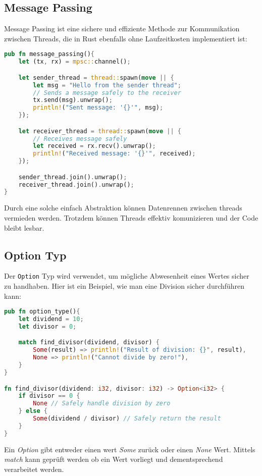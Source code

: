 \subsection{Message Passing}

Message Passing ist eine sichere und effiziente Methode zur Kommunikation zwischen Threads, die in Rust ebenfalls ohne Laufzeitkosten implementiert ist:

\begin{lstlisting}[language=Rust, caption=Message Passing ]
pub fn message_passing(){
    let (tx, rx) = mpsc::channel();

    let sender_thread = thread::spawn(move || {
        let msg = "Hello from the sender thread";
        // Sends a message safely to the receiver
        tx.send(msg).unwrap(); 
        println!("Sent message: '{}'", msg);
    });

    let receiver_thread = thread::spawn(move || {
        // Receives message safely
        let received = rx.recv().unwrap(); 
        println!("Received message: '{}'", received);
    });

    sender_thread.join().unwrap();
    receiver_thread.join().unwrap();
}
\end{lstlisting}
Durch eine solche einfach Abstraktion können Datenrennen zwischen threads vermieden werden.
Trotzdem können Threads effektiv komunizieren und der Code bleibt lesbar.
\subsection{Option Typ}

Der \texttt{Option} Typ wird verwendet, um mögliche Abwesenheit eines Wertes sicher zu handhaben. Hier ist ein Beispiel, wie man eine Division sicher durchführen kann:

\begin{lstlisting}[language=Rust, caption=Option Typ]
pub fn option_type(){
    let dividend = 10;
    let divisor = 0;

    match find_divisor(dividend, divisor) {
        Some(result) => println!("Result of division: {}", result),
        None => println!("Cannot divide by zero!"),
    }
}

fn find_divisor(dividend: i32, divisor: i32) -> Option<i32> {
    if divisor == 0 {
        None // Safely handle division by zero
    } else {
        Some(dividend / divisor) // Safely return the result
    }
}
\end{lstlisting}
\noindent
Ein \textit{Option} gibt entweder einen wert \textit{Some} zurück oder einen \textit{None} Wert.
Mittels \textit{match} kann geprüft werden ob ein Wert vorliegt und dementsprechend verarbeitet werden.

